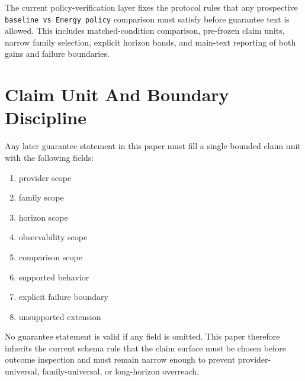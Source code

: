 \documentclass[11pt]{article}
\begin{document}
The current policy-verification layer fixes the protocol rules that any prospective
\texttt{baseline vs Energy policy} comparison must satisfy before guarantee text is
allowed. This includes matched-condition comparison, pre-frozen claim units, narrow
family selection, explicit horizon bands, and main-text reporting of both gains and
failure boundaries.

\section{Claim Unit And Boundary Discipline}

Any later guarantee statement in this paper must fill a single bounded claim unit
with the following fields:

\begin{enumerate}
\item provider scope
\item family scope
\item horizon scope
\item observability scope
\item comparison scope
\item supported behavior
\item explicit failure boundary
\item unsupported extension
\end{enumerate}

No guarantee statement is valid if any field is omitted. This paper therefore
inherits the current schema rule that the claim surface must be chosen before
outcome inspection and must remain narrow enough to prevent provider-universal,
family-universal, or long-horizon overreach.
\end{document}
